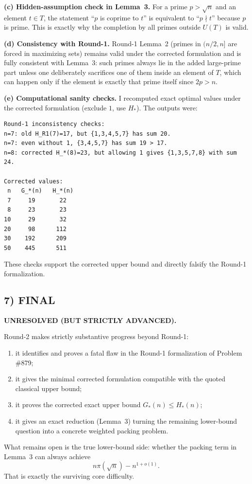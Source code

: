\textbf{(c) Hidden-assumption check in Lemma~3.}
For a prime $p>\sqrt n$ and an element $t\in T$, the statement ``$p$ is coprime to $t$'' is equivalent to ``$p\nmid t$'' because $p$ is prime. This is exactly why the completion by all primes outside $U(T)$ is valid.

\textbf{(d) Consistency with Round-1.}
Round-1 Lemma~2 (primes in $(n/2,n]$ are forced in maximizing sets) remains valid under the corrected formulation and is fully consistent with Lemma~3: such primes always lie in the added large-prime part unless one deliberately sacrifices one of them inside an element of $T$, which can happen only if the element is exactly that prime itself since $2p>n$.

\textbf{(e) Computational sanity checks.}
I recomputed exact optimal values under the corrected formulation (exclude $1$, use $H_*$). The outputs were:
\begin{verbatim}
Round-1 inconsistency checks:
n=7: old H_R1(7)=17, but {1,3,4,5,7} has sum 20.
n=7: even without 1, {3,4,5,7} has sum 19 > 17.
n=8: corrected H_*(8)=23, but allowing 1 gives {1,3,5,7,8} with sum 24.

Corrected values:
 n   G_*(n)   H_*(n)
 7     19       22
 8     23       23
10     29       32
20     98      112
30    192      209
50    445      511
\end{verbatim}
These checks support the corrected upper bound and directly falsify the Round-1 formalization.

\subsection*{7) FINAL}
\textbf{UNRESOLVED (BUT STRICTLY ADVANCED).}

Round-2 makes strictly substantive progress beyond Round-1:
\begin{enumerate}
\item it identifies and proves a fatal flaw in the Round-1 formalization of Problem \#879;
\item it gives the minimal corrected formulation compatible with the quoted classical upper bound;
\item it proves the corrected exact upper bound $G_*(n)\le H_*(n)$;
\item it gives an exact reduction (Lemma~3) turning the remaining lower-bound question into a concrete weighted packing problem.
\end{enumerate}

What remains open is the true lower-bound side: whether the packing term in Lemma~3 can always achieve
\[
n\pi(\sqrt n)-n^{1+o(1)}.
\]
That is exactly the surviving core difficulty.

